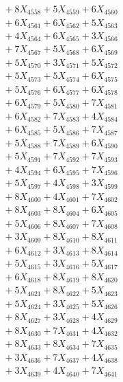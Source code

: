 \documentclass[a4paper,10pt]{article}
\begin{document}
{\begin{align}
&\;  + 8 X_{4558} + 5 X_{4559} + 6 X_{4560} \\[0.3ex]
&\;  + 6 X_{4561} + 6 X_{4562} + 5 X_{4563} \\[0.3ex]
&\;  + 4 X_{4564} + 6 X_{4565} + 3 X_{4566} \\[0.3ex]
&\;  + 7 X_{4567} + 5 X_{4568} + 6 X_{4569} \\[0.5ex]\allowbreak
&\;  + 5 X_{4570} + 3 X_{4571} + 5 X_{4572} \\[0.3ex]
&\;  + 5 X_{4573} + 5 X_{4574} + 6 X_{4575} \\[0.3ex]
&\;  + 5 X_{4576} + 6 X_{4577} + 6 X_{4578} \\[0.3ex]
&\;  + 6 X_{4579} + 5 X_{4580} + 7 X_{4581} \\[0.3ex]
&\;  + 6 X_{4582} + 7 X_{4583} + 4 X_{4584} \\[0.3ex]
&\;  + 6 X_{4585} + 5 X_{4586} + 7 X_{4587} \\[0.3ex]
&\;  + 5 X_{4588} + 7 X_{4589} + 6 X_{4590} \\[0.3ex]
&\;  + 5 X_{4591} + 7 X_{4592} + 7 X_{4593} \\[0.3ex]
&\;  + 4 X_{4594} + 6 X_{4595} + 7 X_{4596} \\[0.3ex]
&\;  + 5 X_{4597} + 4 X_{4598} + 3 X_{4599} \\[0.5ex]\allowbreak
&\;  + 8 X_{4600} + 4 X_{4601} + 7 X_{4602} \\[0.3ex]
&\;  + 8 X_{4603} + 8 X_{4604} + 6 X_{4605} \\[0.3ex]
&\;  + 5 X_{4606} + 8 X_{4607} + 7 X_{4608} \\[0.3ex]
&\;  + 3 X_{4609} + 8 X_{4610} + 8 X_{4611} \\[0.3ex]
&\;  + 6 X_{4612} + 3 X_{4613} + 8 X_{4614} \\[0.3ex]
&\;  + 5 X_{4615} + 3 X_{4616} + 5 X_{4617} \\[0.3ex]
&\;  + 6 X_{4618} + 8 X_{4619} + 8 X_{4620} \\[0.3ex]
&\;  + 5 X_{4621} + 8 X_{4622} + 5 X_{4623} \\[0.3ex]
&\;  + 5 X_{4624} + 3 X_{4625} + 5 X_{4626} \\[0.3ex]
&\;  + 8 X_{4627} + 3 X_{4628} + 4 X_{4629} \\[0.5ex]\allowbreak
&\;  + 8 X_{4630} + 7 X_{4631} + 4 X_{4632} \\[0.3ex]
&\;  + 8 X_{4633} + 8 X_{4634} + 7 X_{4635} \\[0.3ex]
&\;  + 3 X_{4636} + 7 X_{4637} + 4 X_{4638} \\[0.3ex]
&\;  + 3 X_{4639} + 4 X_{4640} + 7 X_{4641} \\[0.3ex]

\end{align}}
\end{document}
